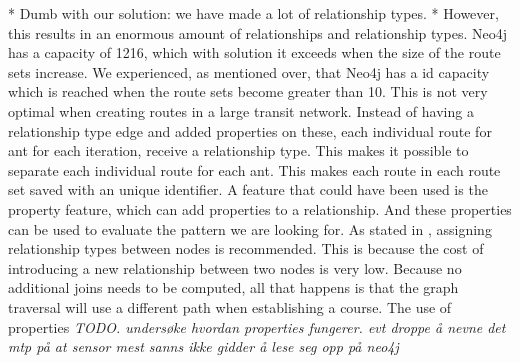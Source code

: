 * Dumb with our solution: we have made a lot of relationship types.
* However, this results in an enormous amount of relationships and relationship types. Neo4j has a capacity of 1216, which with solution it exceeds when the size of the route sets increase. We experienced, as mentioned over, that Neo4j has a id capacity which is reached when the route sets become greater than 10. This is not very optimal when creating routes in a large transit network. Instead of having a relationship type edge and added properties on these, each individual route for ant for each iteration, receive a relationship type. This makes it possible to separate each individual route for each ant. This makes each route in each route set saved with an unique identifier. A feature that could have been used is the property feature, which can add properties to a relationship. And these properties can be used to evaluate the pattern we are looking for. As stated in \citet{bruggen14}, assigning relationship types between nodes is recommended. This is because the cost of introducing a new relationship between two nodes is very low. Because no additional joins needs to be computed, all that happens is that the graph traversal will use a different path when establishing a course. The use of properties \emph{\color{blue} TODO. undersøke hvordan properties fungerer. evt droppe å nevne det mtp på at sensor mest sanns ikke gidder å lese seg opp på neo4j}





